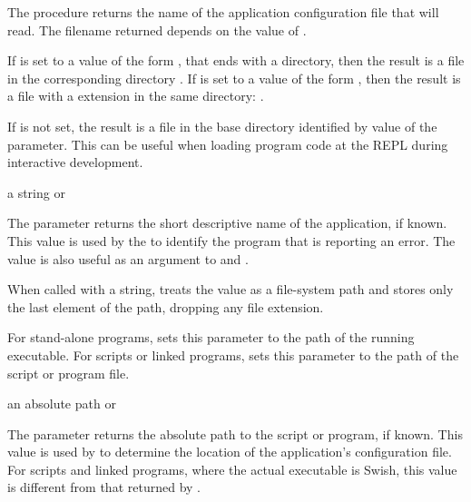 The  procedure returns the name of the application
configuration file that  will read.
The filename returned depends on the value of .

If  is set to a value of the form
,
that ends with a  directory,
then the result is a  file in the corresponding  directory
.
If  is set to a value of the form
,
then the result is a file with a  extension in the same directory:
.

If  is not set, the result is a  file in the base
directory identified by value of the  parameter.
This can be useful when loading program code at the REPL during interactive
development.

\begin{parameter}
\end{parameter}
\hasvalue{} a string or 

The  parameter returns the short descriptive name of the
application, if known.
This value is used by the  to identify the program
that is reporting an error.
The value is also useful as an argument to  and
.

When called with a string,  treats the value as
a file-system path and stores only the last element of the path,
dropping any file extension.

For stand-alone programs, 
sets this parameter to the path of the running executable.
For scripts or linked programs, 
sets this parameter to the path of the script or program file.

\begin{parameter}
\end{parameter}
\hasvalue{} an absolute path or 

The  parameter returns the absolute path to the script or
program, if known.
This value is used by  to determine the
location of the application's configuration file.
For scripts and linked programs, where the actual executable is Swish, this
value is different from that returned by .

